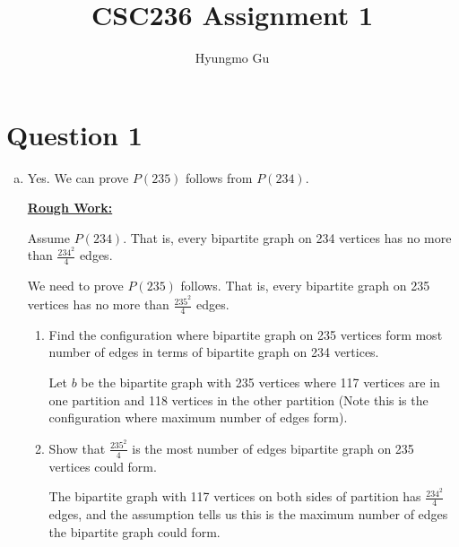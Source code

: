 \documentclass[12pt]{article}
\begin{document}
\title{CSC236 Assignment 1}
\author{Hyungmo Gu}
\maketitle

\section*{Question 1}
\begin{enumerate}[a.]
    \item

    Yes. We can prove $P(235)$ follows from $P(234)$.

    \bigskip

    \begin{mdframed}
        \underline{\textbf{Rough Work:}}

        Assume $P(234)$. That is, every bipartite graph on 234 vertices has no more
        than $\frac{234^2}{4}$ edges.

        \bigskip

        We need to prove $P(235)$ follows. That is, every bipartite graph on 235
        vertices has no more than $\frac{235^2}{4}$ edges.

        \begin{enumerate}[1.]
            \item Find the configuration where bipartite graph on 235 vertices form most number of edges in
            terms of bipartite graph on 234 vertices.

            \begin{mdframed}
            Let $b$ be the bipartite graph with 235 vertices where
            117 vertices are in one partition and 118 vertices in
            the other partition (Note this is the configuration where maximum number of edges form).

            \end{mdframed}

            \item Show that $\frac{235^2}{4}$ is the most number of edges bipartite graph on 235
            vertices could form.

            \begin{mdframed}
            The bipartite graph with 117 vertices on both sides of partition has
            $\frac{234^2}{4}$ edges, and the assumption tells us this is the maximum number of edges the
            bipartite graph could form.


\end{mdframed}
\end{enumerate}
\end{mdframed}
\end{enumerate}
\end{document}
